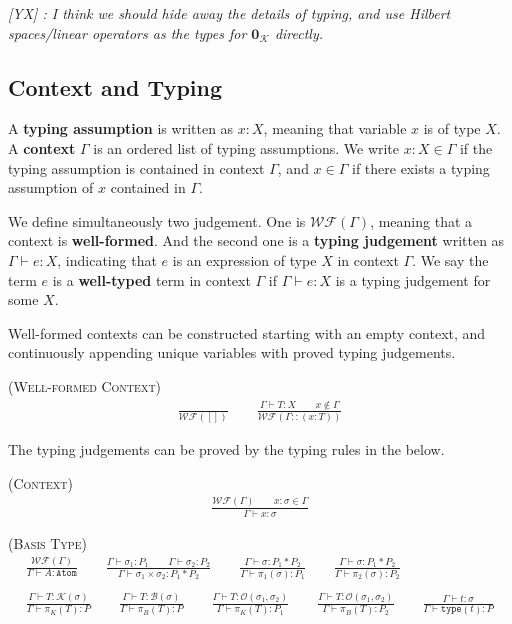 \documentclass[manuscript, review, timestamp]{acmart}
\newcommand{\yx}[1]{\textit{\color{blue}[YX] : #1}}
\newcommand*{\K}{\mathcal{K}}
\newcommand*{\B}{\mathcal{B}}
\newcommand*{\Op}{\mathcal{O}}
\newcommand*{\type}{\texttt{type}}
\begin{document}
\yx{I think we should hide away the details of typing, and use Hilbert spaces/linear operators as the types for $\mathbf{0}_\mathcal{K}$ directly.}


\subsection{Context and Typing}

\begin{definition}[context]
  A \textbf{typing assumption} is written as $x : X$, meaning that variable $x$ is of type $X$. A \textbf{context} $\Gamma$ is an ordered list of typing assumptions. We write $x : X \in \Gamma$ if the typing assumption is contained in context $\Gamma$, and $x \in \Gamma$ if there exists a typing assumption of $x$ contained in $\Gamma$.
\end{definition}


We define simultaneously two judgement. One is $\mathcal{WF}(\Gamma)$, meaning that a context is \textbf{well-formed}. And the second one is a \textbf{typing judgement} written as $\Gamma \vdash e : X$, indicating that $e$ is an expression of type $X$ in context $\Gamma$.
We say the term $e$ is a \textbf{well-typed} term in context $\Gamma$ if $\Gamma \vdash e : X$ is a typing judgement for some $X$.

Well-formed contexts can be constructed starting with an empty context, and continuously appending unique variables with proved typing judgements.

\textsc{(Well-formed Context)}
\begin{gather*}
  \frac{}{\mathcal{WF}([])}
  \qquad
  \frac{\Gamma \vdash T : X \qquad x \notin \Gamma}{\mathcal{WF}(\Gamma :: (x : T))}
\end{gather*}

The typing judgements can be proved by the typing rules in the below.

\textsc{(Context)}
\begin{gather*}
  \frac{\mathcal{WF}(\Gamma) \qquad x : \sigma \in \Gamma}{\Gamma \vdash x : \sigma}
\end{gather*}

\textsc{(Basis Type)}
\begin{gather*}
  \frac{\mathcal{WF}(\Gamma)}{\Gamma \vdash A : \texttt{Atom} }
  \qquad
  \frac{\Gamma \vdash \sigma_1 : P_1 \qquad \Gamma \vdash \sigma_2 : P_2}{\Gamma \vdash \sigma_1 \times \sigma_2 : P_1 * P_2}
  \qquad
  \frac{\Gamma \vdash \sigma : P_1 * P_2}{\Gamma \vdash \pi_1(\sigma) : P_1}
  \qquad
  \frac{\Gamma \vdash \sigma : P_1 * P_2}{\Gamma \vdash \pi_2(\sigma) : P_2} \\
  \\
  \frac{\Gamma \vdash T : \K(\sigma)}{\Gamma \vdash \pi_K(T) : P}
  \qquad
  \frac{\Gamma \vdash T : \B(\sigma)}{\Gamma \vdash \pi_B(T) : P} \qquad
  \frac{\Gamma \vdash T : \Op(\sigma_1, \sigma_2)}{\Gamma \vdash \pi_K(T) : P_1}
  \qquad
  \frac{\Gamma \vdash T : \Op(\sigma_1, \sigma_2)}{\Gamma \vdash \pi_B(T) : P_2}
  \qquad
  \frac{\Gamma \vdash t : \sigma}{\Gamma \vdash \type(t) : P}
\end{gather*}
\end{document}
